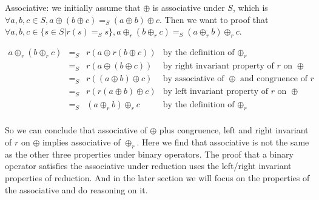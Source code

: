 \documentclass[a4paper,10pt]{article}
\newcommand{\e}[2]{
\begin{equation}
  \label{#1} 
  #2
\end{equation}
}
\begin{document}
Associative: we initially assume that $\oplus$ is associative under $S$, which is $\forall a,b,c \in S, a \oplus (b \oplus c) =_S (a \oplus b) \oplus c$. Then we want to proof that $\forall a,b,c \in \{s \in S | r(s) =_S s\}, a \oplus_r (b \oplus_r c) =_S (a \oplus_r b) \oplus_r c$. 
\e{r:proof:associative}{
\begin{array}{rcll} 
a \oplus_r (b \oplus_r c) & =_S & r(a \oplus r(b \oplus c)) &\mbox{by the definition of $\oplus_r$} \\
			 & =_S & r(a \oplus (b \oplus c)) &\mbox{by right invariant property of $r$ on $\oplus$}\\
			 & =_S & r((a \oplus b) \oplus c) &\mbox{by associative of $\oplus$ and congruence of $r$}\\
			 & =_S & r(r(a \oplus b) \oplus c) &\mbox{by left invariant property of $r$ on $\oplus$}\\
             & =_S & (a \oplus_r b) \oplus_r c  &\mbox{by the definition of $\oplus_r$} \\
\end{array}}
So we can conclude that associative of $\oplus$ plus congruence, left and right invariant of $r$ on $\oplus$ implies associative of $\oplus_r$.
Here we find that associative is not the same as the other three properties under binary operators. The proof that a binary operator satisfies the associative under reduction uses the left/right invariant properties of reduction. And in the later section we will focus on the properties of the associative and do reasoning on it. 
\end{document}
